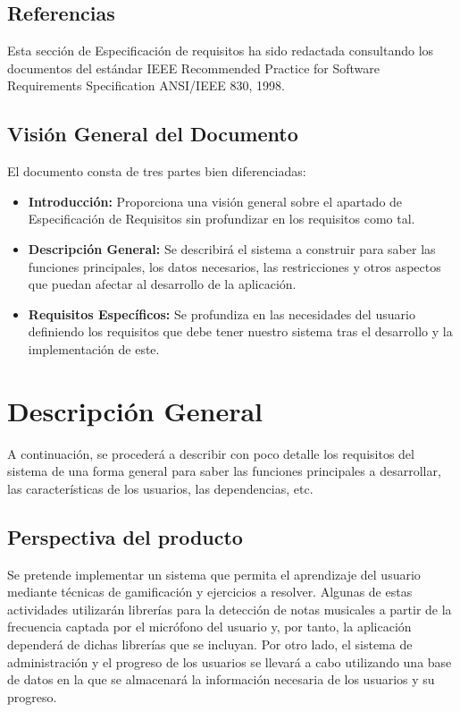 \subsection{Referencias}
Esta sección de Especificación de requisitos ha sido redactada consultando los documentos del estándar IEEE Recommended Practice for Software Requirements Specification ANSI/IEEE 830, 1998.

\subsection{Visión General del Documento}
El documento consta de tres partes bien diferenciadas:
\begin{itemize}
    \item \textbf{Introducción:} Proporciona una visión general sobre el apartado de Especificación de Requisitos sin profundizar en los requisitos como tal.
    \item \textbf{Descripción General:} Se describirá el sistema a construir para saber las funciones principales, los datos necesarios, las restricciones y otros aspectos que puedan afectar al desarrollo de la aplicación.
    \item \textbf{Requisitos Específicos:} Se profundiza en las necesidades del usuario definiendo los requisitos que debe tener nuestro sistema tras el desarrollo y la implementación de este.
\end{itemize}

\section{Descripción General}
A continuación, se procederá a describir con poco detalle los requisitos del sistema de una forma general para saber las funciones principales a desarrollar, las características de los usuarios, las dependencias, etc.
\subsection{Perspectiva del producto}
Se pretende implementar un sistema que permita el aprendizaje del usuario mediante técnicas de gamificación y ejercicios a resolver. Algunas de estas actividades utilizarán librerías para la detección de notas musicales
a partir de la frecuencia captada por el micrófono del usuario y, por tanto, la aplicación dependerá de dichas librerías que se incluyan.
Por otro lado, el sistema de administración y el progreso de los usuarios se llevará a cabo utilizando una base de datos en la que se almacenará la información necesaria de los usuarios y su progreso.

